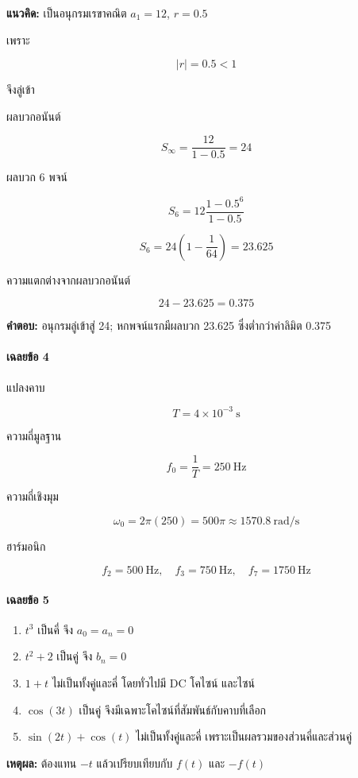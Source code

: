 \textbf{แนวคิด:} เป็นอนุกรมเรขาคณิต \(a_1=12\), \(r=0.5\)

เพราะ

\[
|r|=0.5<1
\]

จึงลู่เข้า

ผลบวกอนันต์

\[
S_\infty=\frac{12}{1-0.5}=24
\]

ผลบวก 6 พจน์

\[
S_6=12\frac{1-0.5^6}{1-0.5}
\]

\[
S_6=24\left(1-\frac{1}{64}\right)=23.625
\]

ความแตกต่างจากผลบวกอนันต์

\[
24-23.625=0.375
\]

\textbf{คำตอบ:} อนุกรมลู่เข้าสู่ 24; หกพจน์แรกมีผลบวก 23.625 ซึ่งต่ำกว่าค่าลิมิต 0.375

\paragraph{เฉลยข้อ 4}

แปลงคาบ

\[
T=4\times10^{-3}\ \text{s}
\]

ความถี่มูลฐาน

\[
f_0=\frac{1}{T}=250\ \text{Hz}
\]

ความถี่เชิงมุม

\[
\omega_0=2\pi(250)=500\pi\approx1570.8\ \text{rad/s}
\]

ฮาร์มอนิก

\[
f_2=500\ \text{Hz},\quad f_3=750\ \text{Hz},\quad f_7=1750\ \text{Hz}
\]

\paragraph{เฉลยข้อ 5}

\begin{enumerate}
\def\labelenumi{\arabic{enumi}.}
\item
  \(t^3\) เป็นคี่ จึง \(a_0=a_n=0\)
\item
  \(t^2+2\) เป็นคู่ จึง \(b_n=0\)
\item
  \(1+t\) ไม่เป็นทั้งคู่และคี่ โดยทั่วไปมี DC โคไซน์ และไซน์
\item
  \(\cos(3t)\) เป็นคู่ จึงมีเฉพาะโคไซน์ที่สัมพันธ์กับคาบที่เลือก
\item
  \(\sin(2t)+\cos(t)\) ไม่เป็นทั้งคู่และคี่ เพราะเป็นผลรวมของส่วนคี่และส่วนคู่
\end{enumerate}

\textbf{เหตุผล:} ต้องแทน \(-t\) แล้วเปรียบเทียบกับ \(f(t)\) และ \(-f(t)\)

